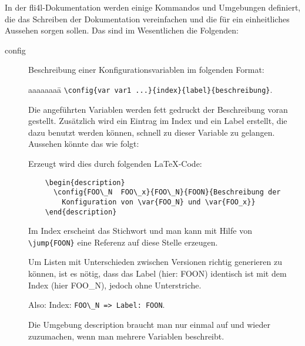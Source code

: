 In der fli4l-Dokumentation werden einige Kommandos und Umgebungen definiert,
die das Schreiben der Dokumentation vereinfachen und die für ein
einheitliches Aussehen sorgen sollen. Das sind im Wesentlichen die
Folgenden:

\begin{description}
\item [config]  Beschreibung einer Konfigurationsvariablen im
  folgenden Format:
  \begin{tabbing}
    aaaaaaaa\=\kill
    \>\verb*?\config{var var1 ...}{index}{label}{beschreibung}?.
  \end{tabbing}

  Die angeführten Variablen werden fett gedruckt der Beschreibung
  voran gestellt. Zusätzlich wird ein Eintrag im Index und ein Label
  erstellt, die dazu benutzt werden können, schnell zu dieser Variable
  zu gelangen. Aussehen könnte das wie folgt:

  \begin{description}
  \end{description}

  Erzeugt wird dies durch folgenden \LaTeX-Code:

\begin{verbatim}
    \begin{description}
      \config{FOO\_N  FOO\_x}{FOO\_N}{FOON}{Beschreibung der
        Konfiguration von \var{FOO_N} und \var{FOO_x}}
    \end{description}
\end{verbatim}

  Im Index erscheint das Stichwort  und man kann mit Hilfe von
  \verb*?\jump{FOON}? eine Referenz auf diese Stelle erzeugen.

  Um Listen mit Unterschieden zwischen Versionen richtig generieren zu können,
  ist es nötig, dass das Label (hier: FOON) identisch ist mit dem Index
  (hier FOO\_N), jedoch ohne Unterstriche.

  Also: Index: \verb?FOO\_N => Label: FOON?.

  Die Umgebung \glqq{}description\grqq{} braucht man nur einmal auf und wieder
  zuzumachen, wenn man mehrere Variablen beschreibt.


\end{description}
